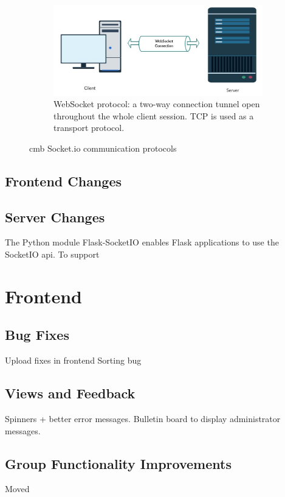 \begin{figure}
\begin{subfigure}[b]{1.0\textwidth}
        \label{fig:long-polling}
    \end{subfigure}
    \begin{subfigure}[b]{1.0\textwidth}
        \includegraphics[width=\textwidth]{figs/websocket.jpg}
        \caption{WebSocket protocol: a two-way connection tunnel open throughout the whole client session. TCP is used as a transport protocol.}
        \label{fig:websocket}
    \end{subfigure}
    \caption{\gls{cmb} Socket.io communication protocols}\label{fig:cmb-protocols}
\end{figure}

\subsection{Frontend Changes}

\subsection{Server Changes}
The Python module Flask-SocketIO \cite{FLASKSOCKETIO} enables Flask applications to use the SocketIO \gls{api}. To support

\section{Frontend}
\subsection{Bug Fixes}
Upload fixes in frontend
Sorting bug

\subsection{Views and Feedback}
Spinners + better error messages. Bulletin board to display administrator messages.

\subsection{Group Functionality Improvements}
Moved

